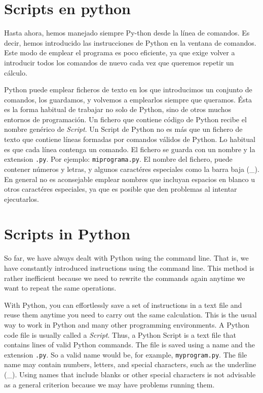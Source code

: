 \begin{paracol}{2}
\section[Scripts en Python]{Scripts en python} 

Hasta ahora, hemos manejado siempre Py-thon desde la línea de comandos. Es decir, hemos introducido las instrucciones de Python en la ventana de comandos. Este modo de emplear el programa es poco eficiente, ya que exige volver a introducir todos los comandos de nuevo cada vez que queremos repetir un cálculo.

Python puede emplear ficheros de texto en los que introducimos un conjunto de comandos, los guardamos, y volvemos a emplearlos siempre que queramos. Ésta es la forma habitual de trabajar no solo de Python, sino de otros muchos entornos de programación. Un fichero que contiene código de Python recibe el nombre genérico de \emph{Script}. Un Script de Python  no es más que un fichero de texto que contiene líneas formadas por comandos válidos de Python. Lo habitual es que cada línea contenga un comando. El fichero se guarda con un nombre y la extension \texttt{.py}. Por ejemplo: \texttt{miprograma.py}. El nombre del fichero, puede contener números y letras, y algunos caractéres especiales como la barra baja (\_). En general no es aconsejable emplear nombres que incluyan espacios en blanco u otros caractéres especiales, ya que es posible que den problemas al intentar ejecutarlos.  

\switchcolumn
\section[Scripts in Python ]{Scripts in Python } 
So far, we have always dealt with Python using the command line. That is, we have constantly introduced instructions using the command line. This method is rather inefficient because we need to rewrite the commands again anytime we want to repeat the same operations.

With Python, you can effortlessly save a set of instructions in a text file and reuse them anytime you need to carry out the same calculation. This is the usual way to work in Python and many other programming environments. A Python code file is usually called a \emph{Script}. Thus, a Python Script is a text file that contains lines of valid Python commands. The file is saved using a name and the extension \texttt{.py}. So a valid name would be, for example, \texttt{myprogram.py}. The file name may contain numbers, letters, and special characters, such as the underline (\_). Using names that include blanks or other special characters is not advisable as a general criterion because we may have problems running them.
\end{paracol}

